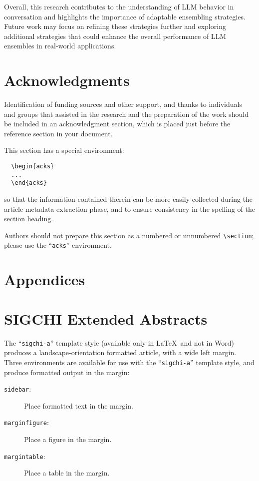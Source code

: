 \documentclass[sigconf,authordraft]{acmart}
\begin{document}
Overall, this research contributes to the understanding of LLM behavior in conversation and highlights the importance of adaptable ensembling strategies. Future work may focus on refining these strategies further and exploring additional strategies that could enhance the overall performance of LLM ensembles in real-world applications.



\section{Acknowledgments}

Identification of funding sources and other support, and thanks to
individuals and groups that assisted in the research and the
preparation of the work should be included in an acknowledgment
section, which is placed just before the reference section in your
document.

This section has a special environment:
\begin{verbatim}
  \begin{acks}
  ...
  \end{acks}
\end{verbatim}
so that the information contained therein can be more easily collected
during the article metadata extraction phase, and to ensure
consistency in the spelling of the section heading.

Authors should not prepare this section as a numbered or unnumbered {\verb|\section|}; please use the ``{\verb|acks|}'' environment.

\section{Appendices}



\section{SIGCHI Extended Abstracts}

The ``\verb|sigchi-a|'' template style (available only in \LaTeX\ and
not in Word) produces a landscape-orientation formatted article, with
a wide left margin. Three environments are available for use with the
``\verb|sigchi-a|'' template style, and produce formatted output in
the margin:
\begin{description}
\item[\texttt{sidebar}:]  Place formatted text in the margin.
\item[\texttt{marginfigure}:] Place a figure in the margin.
\item[\texttt{margintable}:] Place a table in the margin.
\end{description}
\end{document}
